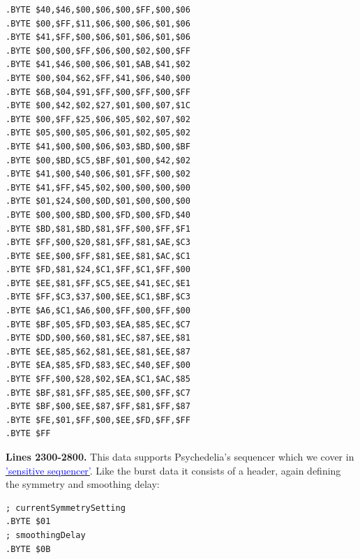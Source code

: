 \begin{minipage}[b]{0.33\linewidth}
\begin{lrbox}{\mybox}
\begin{lstlisting}[basicstyle=\ttfamily\tiny]
.BYTE $40,$46,$00,$06,$00,$FF,$00,$06
.BYTE $00,$FF,$11,$06,$00,$06,$01,$06
.BYTE $41,$FF,$00,$06,$01,$06,$01,$06
.BYTE $00,$00,$FF,$06,$00,$02,$00,$FF
.BYTE $41,$46,$00,$06,$01,$AB,$41,$02
.BYTE $00,$04,$62,$FF,$41,$06,$40,$00
.BYTE $6B,$04,$91,$FF,$00,$FF,$00,$FF
.BYTE $00,$42,$02,$27,$01,$00,$07,$1C
.BYTE $00,$FF,$25,$06,$05,$02,$07,$02
.BYTE $05,$00,$05,$06,$01,$02,$05,$02
.BYTE $41,$00,$00,$06,$03,$BD,$00,$BF
.BYTE $00,$BD,$C5,$BF,$01,$00,$42,$02
.BYTE $41,$00,$40,$06,$01,$FF,$00,$02
.BYTE $41,$FF,$45,$02,$00,$00,$00,$00
.BYTE $01,$24,$00,$0D,$01,$00,$00,$00
.BYTE $00,$00,$BD,$00,$FD,$00,$FD,$40
.BYTE $BD,$81,$BD,$81,$FF,$00,$FF,$F1
.BYTE $FF,$00,$20,$81,$FF,$81,$AE,$C3
.BYTE $EE,$00,$FF,$81,$EE,$81,$AC,$C1
.BYTE $FD,$81,$24,$C1,$FF,$C1,$FF,$00
.BYTE $EE,$81,$FF,$C5,$EE,$41,$EC,$E1
.BYTE $FF,$C3,$37,$00,$EE,$C1,$BF,$C3
.BYTE $A6,$C1,$A6,$00,$FF,$00,$FF,$00
.BYTE $BF,$05,$FD,$03,$EA,$85,$EC,$C7
.BYTE $DD,$00,$60,$81,$EC,$87,$EE,$81
.BYTE $EE,$85,$62,$81,$EE,$81,$EE,$87
.BYTE $EA,$85,$FD,$83,$EC,$40,$EF,$00
.BYTE $FF,$00,$28,$02,$EA,$C1,$AC,$85
.BYTE $BF,$81,$FF,$85,$EE,$00,$FF,$C7
.BYTE $BF,$00,$EE,$87,$FF,$81,$FF,$87
.BYTE $FE,$01,$FF,$00,$EE,$FD,$FF,$FF
.BYTE $FF

\end{lstlisting}
\end{lrbox}%
\scalebox{0.8}{\usebox{\mybox}}
\end{minipage}
\clearpage
{}
\textbf{Lines 2300-2800.} This data supports Psychedelia's sequencer which we cover in 
\hyperref[sec:sequencer]{\textcolor{blue}{'sensitive sequencer'}}.  Like the burst data it consists of a header, again defining the symmetry and smoothing delay:
\begin{lstlisting}
; currentSymmetrySetting
.BYTE $01
; smoothingDelay
.BYTE $0B
\end{lstlisting}

